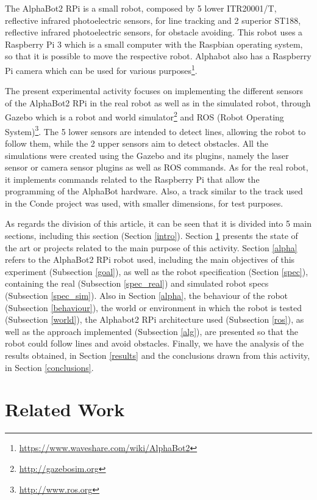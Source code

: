 \documentclass[conference]{IEEEtran}
\begin{document}
The AlphaBot2 RPi is a small robot, composed by 5 lower ITR20001/T, reflective infrared photoelectric sensors, for line tracking and 2 superior ST188, reflective infrared photoelectric sensors, for obstacle avoiding. This robot uses a Raspberry Pi 3 which is a small computer with the Raspbian operating system, so that it is possible to move the respective robot. Alphabot also has a Raspberry Pi camera which can be used for various purposes\footnote{\url{https://www.waveshare.com/wiki/AlphaBot2}}.

The present experimental activity focuses on implementing the different sensors of the AlphaBot2 RPi in the real robot as well as in the simulated robot, through Gazebo which is a robot and world simulator\footnote{\url{http://gazebosim.org}} and ROS (Robot Operating System)\footnote{\url{http://www.ros.org}}. The 5 lower sensors are intended to detect lines, allowing the robot to follow them, while the 2 upper sensors aim to detect obstacles. All the simulations were created using the Gazebo and its plugins, namely the laser sensor or camera sensor plugins as well as ROS commands. As for the real robot, it implements commands related to the Raspberry Pi that allow the programming of the AlphaBot hardware. Also, a track similar to the track used in the Conde project\cite{b1, b2, b3} was used, with smaller dimensions, for test purposes.

As regards the division of this article, it can be seen that it is divided into 5 main sections, including this section (Section \ref{intro}). Section \ref{relwork} presents the state of the art or projects related to the main purpose of this activity. Section \ref{alpha} refers to the AlphaBot2 RPi robot used, including the main objectives of this experiment (Subsection \ref{goal}), as well as the robot specification (Section \ref{spec}), containing the real (Subsection \ref{spec_real}) and simulated robot specs (Subsection \ref{spec_sim}). Also in Section \ref{alpha}, the behaviour of the robot (Subsection \ref{behaviour}), the world or environment in which the robot is tested (Subsection \ref{world}), the Alphabot2 RPi architecture used (Subsection \ref{ros}), as well as the approach implemented (Subsection \ref{alg}), are presented so that the robot could follow lines and avoid obstacles. Finally, we have the analysis of the results obtained, in Section \ref{results} and the conclusions drawn from this activity, in Section \ref{conclusions}.

\section{Related Work} \label{relwork}
\end{document}
